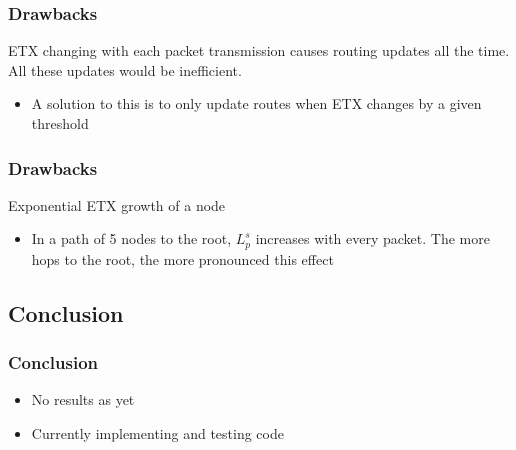 \documentclass{beamer}
\begin{document}
\begin{frame}
  \frametitle{Drawbacks}
    ETX changing with each packet transmission causes routing updates all the
    time. All these updates would be inefficient.
  \begin{itemize}
    \item A solution to this is to only update routes when ETX changes by a given
    threshold
    \end{itemize}
\end{frame}  


\begin{frame}
  \frametitle{Drawbacks}
    Exponential ETX growth of a node
  \begin{itemize}
    \item In a path of 5 nodes to the root, $L_p^s$ increases with every packet.
    The more hops to the root, the more pronounced this effect
  \end{itemize}
\end{frame}  

\subsection{Conclusion}

\begin{frame}
  \frametitle{Conclusion}
  \begin{itemize}
    \item No results as yet
    \item Currently implementing and testing code
  \end{itemize}
\end{frame}  
\end{document}
